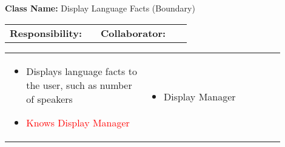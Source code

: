 \begin{cards}[]
    \textbf{Class Name:} Display Language Facts (Boundary)
    \tcbline
    \begin{tabular}{p{0.45\linewidth} | p{0.45\linewidth}}
        \textbf{Responsibility:}& 
        \textbf{Collaborator:}\\
    \end{tabular}
    \tcbline
    \begin{tabular}{p{0.45\linewidth} | p{0.45\linewidth}}
        \begin{itemize}
            \item Displays language facts to the user, such as number of speakers
            \item \textcolor{red}{Knows Display Manager}
        \end{itemize}
        &
        \begin{itemize}
            \item Display Manager
        \end{itemize}
    \end{tabular}
\end{cards}